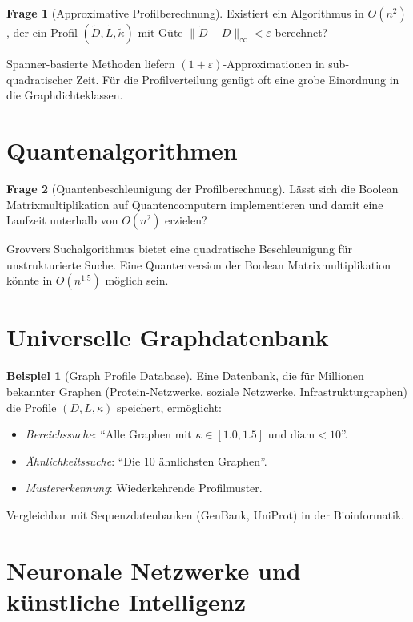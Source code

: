 ﻿\documentclass[a4paper,12pt,openany,oneside]{book}
\theoremstyle{definition}
\newtheorem{beispiel}{Beispiel}[chapter]
\newtheorem{frage}{Frage}[chapter]
\theoremstyle{plain}
\theoremstyle{remark}
\begin{document}
\begin{frage}[Approximative Profilberechnung]
  Existiert ein Algorithmus in $O(n^2)$, der ein Profil
  $(\tilde{D}, \tilde{L}, \tilde{\kappa})$ mit G\"ute
  $\|\tilde{D} - D\|_\infty < \varepsilon$ berechnet?
\end{frage}

Spanner-basierte Methoden liefern $(1+\varepsilon)$-Approximationen in
sub-quadratischer Zeit. F\"ur die Profilverteilung gen\"ugt oft eine grobe
Einordnung in die Graphdichteklassen.

\section{Quantenalgorithmen}

\begin{frage}[Quantenbeschleunigung der Profilberechnung]
  L\"asst sich die Boolean Matrixmultiplikation auf Quantencomputern
  implementieren und damit eine Laufzeit unterhalb von $O(n^2)$ erzielen?
\end{frage}

Grovvers Suchalgorithmus bietet eine quadratische Beschleunigung f\"ur
unstrukturierte Suche. Eine Quantenversion der Boolean Matrixmultiplikation
k\"onnte in $O(n^{1.5})$ m\"oglich sein.

\section{Universelle Graphdatenbank}

\begin{beispiel}[Graph Profile Database]
  Eine Datenbank, die f\"ur Millionen bekannter Graphen
  (Protein-Netzwerke, soziale Netzwerke, Infrastrukturgraphen) die Profile
  $(D, L, \kappa)$ speichert, erm\"oglicht:
  \begin{itemize}
    \item \emph{Bereichssuche}: ``Alle Graphen mit $\kappa \in [1.0,1.5]$
          und $\mathrm{diam} < 10$''.
    \item \emph{\"Ahnlichkeitssuche}: ``Die 10 \"ahnlichsten Graphen''.
    \item \emph{Mustererkennung}: Wiederkehrende Profilmuster.
  \end{itemize}
  Vergleichbar mit Sequenzdatenbanken (GenBank, UniProt) in der Bioinformatik.
\end{beispiel}

\section{Neuronale Netzwerke und k\"unstliche Intelligenz}
\end{document}
